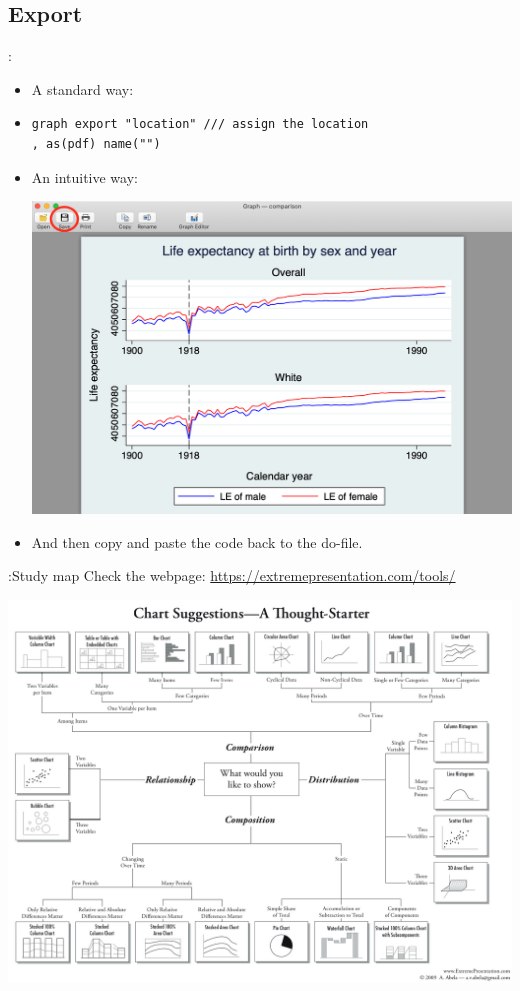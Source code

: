 \subsection{Export}
\begin{frame}[fragile]{\secname: \subsecname}
\begin{itemize}
	\item A standard way: 
	\item[] \begin{verbatim}
graph export "location" /// assign the location
, as(pdf) name("")	
 \end{verbatim}
	\item An intuitive way: \\
	\begin{center}
	\includegraphics[scale=0.15]{images/export}
\end{center}
\item And then copy and paste the code back to the do-file.
\end{itemize}

\end{frame}

\begin{frame}{\secname:Study map}
Check the webpage: \url{https://extremepresentation.com/tools/}
\vspace{-10pt}
\begin{center}
	\includegraphics[scale=0.18]{images/chart}
\end{center}

\end{frame}




